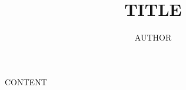 \documentclass[12pt,a4paper]{article}
\title{{{TITLE}}}
\author{{{AUTHOR}}}
\date{}
\begin{document}
\maketitle
\tableofcontents
\newpage

{{CONTENT}}
\end{document}
